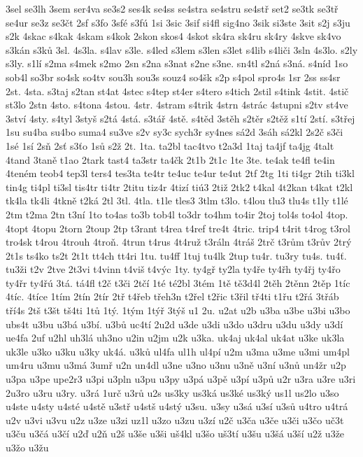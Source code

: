 {3sel
se3lh
3sem
ser4va
se3s2
ses4k
se4ss
se4stra
se4stru
se4stř
set2
se3tk
se3tř
se4ur
se3z
se3čt
2sf
s3fo
3sfé
s3fú
1si
3sic
3sif
si4fl
sig4no
3sik
si3ste
3sit
s2j
s3ju
s2k
4skac
s4kak
4skam
s4kok
2skon
skos4
4skot
sk4ra
sk4ru
sk4ry
4skve
sk4vo
s3kán
s3ků
3sl.
4s3la.
s4lav
s3le.
s4led
s3lem
s3len
s3let
s4lib
s4liči
3sln
4s3lo.
s2ly
s3ly.
s1lí
s2ma
s4mek
s2mo
2sn
s2na
s3nat
s2ne
s3ne.
sn4tl
s2ná
s3ná.
s4níd
1so
sob4l
so3br
so4sk
so4tv
sou3h
sou3s
souz4
so4šk
s2p
s4pol
spro4s
1sr
2ss
ss4sr
2st.
4sta.
s3taj
s2tan
st4at
4stec
s4tep
st4er
s4tero
s4tich
2stil
s4tink
4stit.
4stič
st3lo
2stn
4sto.
s4tona
4stou.
4str.
4stram
s4trik
4strn
4strác
4stupni
s2tv
st4ve
3ství
4sty.
s4tyl
3styš
s2tá
4stá.
s3tář
4stě.
s4těd
3stěh
s2těr
s2těž
s1tí
2stí.
s3třej
1su
su4ba
su4bo
suma4
su3ve
s2v
sy3c
sych3r
sy4nes
sá2d
3sáh
sá2kl
2s2č
s3či
1sé
1sí
2sň
2sť
s3ťo
1sů
s2ž
2t.
1ta.
ta2bl
tac4tvo
t2a3d
1taj
ta4jf
ta4jg
4talt
4tand
3taně
t1ao
2tark
tast4
ta3str
ta4čk
2t1b
2t1c
1te
3te.
te4ak
te4fl
te4in
4teném
teob4
tep3l
ters4
tes3ta
te4tr
te4uc
te4ur
te4ut
2tf
2tg
1ti
ti4gr
2tih
ti3kl
tin4g
ti4pl
ti3sl
tis4tr
ti4tr
2titu
tiz4r
4tizí
tiú3
2tiž
2tk2
t4kal
4t2kan
t4kat
t2kl
tk4la
tk4li
4tkně
t2ká
2tl
3tl.
4tla.
t1le
tles3
3tlm
t3lo.
t4lou
tlu3
tlu4s
t1ly
t1lé
2tm
t2ma
2tn
t3ní
1to
to4as
to3b
tob4l
to3dr
to4hm
to4ir
2toj
tol4s
to4ol
4top.
4topt
4topu
2torn
2toup
2tp
t3rant
t4rea
t4ref
tre4t
4tric.
trip4
t4rit
t4rog
t3rol
tro4sk
t4rou
4trouh
4troň.
4trun
t4rus
4t4ruž
t3ráln
4tráš
2trč
t3rům
t3rův
2trý
2t1s
ts4ko
ts2t
2t1t
tt4ch
tt4ri
1tu.
tu4ff
1tuj
tu4lk
2tup
tu4r.
tu3ry
tu4s.
tu4ť.
tu3ži
t2v
2tve
2t3vi
t4vinn
t4viš
t4výc
1ty.
ty4gř
ty2la
ty4ře
ty4řh
ty4řj
ty4řo
ty4řr
ty4řú
3tá.
tá4fl
t2č
t3či
2tčí
1té
té2bl
3tém
1tě
tě3d4l
2těh
2těnn
2těp
1tíc
4tíc.
4tíce
1tím
2tín
2tír
2tř
t4řeb
třeh3n
t2řel
t2řic
t3řil
tř4ti
t1řu
t2řá
3třáb
tří4s
2tš
t3št
tš4ti
1tů
1tý.
1tým
1týř
3týš
u1
2u.
u2at
u2b
u3ba
u3be
u3bi
u3bo
ubs4t
u3bu
u3bá
u3bí.
u3bů
uc4tí
2u2d
u3de
u3di
u3do
u3dru
u3du
u3dy
u3dí
ue4fa
2uf
u2hl
uh3lá
uh3no
u2in
u2jm
u2k
u3ka.
uk4aj
uk4al
uk4at
u3ke
uk3la
uk3le
u3ko
u3ku
u3ky
uk4á.
u3ků
ul4fa
ul1h
ul4pí
u2m
u3ma
u3me
u3mi
um4pl
um4ru
u3mu
u3má
3umř
u2n
un4dl
u3ne
u3no
u3nu
u3ně
u3ní
u3nů
un4žr
u2p
u3pa
u3pe
upe2r3
u3pi
u3pln
u3pu
u3py
u3pá
u3pě
u3pí
u3pů
u2r
u3ra
u3re
u3ri
2u3ro
u3ru
u3ry.
u3rá
1urč
u3rů
u2s
us3ky
us3ká
us3ké
us3ký
us1l
us2lo
u3so
u4ste
u4sty
u4sté
u4stě
u3stř
u4stš
u4stý
u3su.
u3sy
u3sá
u3sí
u3sů
u4tro
u4trá
u2v
u3vi
u3vu
u2z
u3ze
u3zi
uz1l
u3zo
u3zu
u3zí
u2č
u3ča
u3če
u3či
u3čo
uč3t
u3ču
u3čá
u3čí
u2ď
u2ň
u2š
u3še
u3ši
uš4kl
u3šo
uš3tí
u3šu
u3šá
u3ší
u2ž
u3že
u3žo
u3žu
}
